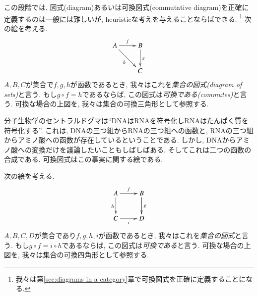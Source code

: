 この段階では, 図式(diagram)あるいは可換図式(commutative diagram)を正確に定義するのは一般には難しいが, 
heuristicな考えを与えることならばできる.
\footnote{我々は第\ref{sec:diagrams in a category}章で可換図式を正確に定義することになる.}
次の絵を考える.
\begin{align}\label{dia:triangle}
\xymatrix{A\ar[r]^f\ar[rd]_h&B\ar[d]^g\\&C}
\end{align}
$A,B,C$が集合で$f,g,h$が函数であるとき, 我々はこれを\emph{集合の図式(diagram of sets)}と言う. もし$g\circ f = h$であるならば, この図式は\emph{可換である(commutes)}と言う. 可換な場合の上図を, 我々は集合の可換三角形として参照する.

\begin{application}


\href{http://en.wikipedia.org/wiki/Central_dogma_of_molecular_biology}{分子生物学のセントラルドグマ}は``DNAはRNAを符号化しRNAはたんぱく質を符号化する''. これは, DNAの三つ組からRNAの三つ組への函数と, RNAの三つ組からアミノ酸への函数が存在しているということである. しかし, DNAからアミノ酸への変換だけを議論したいこともしばしばある. そしてこれは二つの函数の合成である. 可換図式はこの事実に関する絵である.

\end{application}


次の絵を考える.
$$\xymatrix{A\ar[r]^f\ar[d]_h&B\ar[d]^g\\C\ar[r]_i&D}$$
$A,B,C,D$が集合であり$f,g,h,i$が函数であるとき, 我々はこれを\emph{集合の図式}と言う. もし$g\circ f=i\circ h$であるならば, この図式は\emph{可換である}と言う. 可換な場合の上図を, 我々は集合の可換四角形として参照する.

